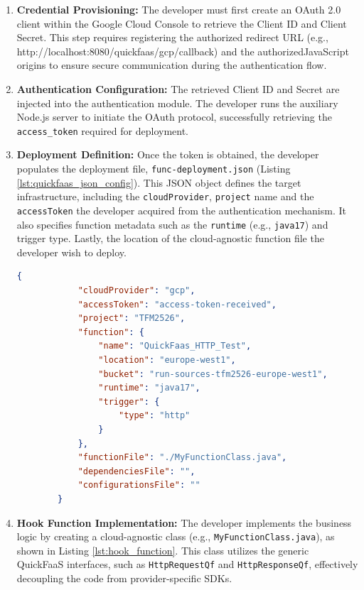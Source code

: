 \begin{enumerate}
	\item \textbf{Credential Provisioning:} The developer must first create an OAuth 2.0 client within the Google Cloud Console to retrieve the Client ID and Client Secret. This step requires registering the authorized redirect URL (e.g., \newline http://localhost:8080/quickfaas/gcp/callback) and the authorizedJavaScript origins to ensure secure communication during the authentication flow.
	
	\item \textbf{Authentication Configuration:} The retrieved Client ID and Secret are injected into the authentication module. The developer runs the auxiliary Node.js server to initiate the OAuth protocol, successfully retrieving the \texttt{access\_token} required for deployment.
	
	\item \textbf{Deployment Definition:} Once the token is obtained, the developer populates the deployment file, \texttt{func-deployment.json} (Listing \ref{lst:quickfaas_json_config}). This JSON object defines the target infrastructure, including the  \texttt{cloudProvider}, \texttt{project} name and the \texttt{accessToken} the developer acquired from the authentication mechanism. It also specifies function metadata such as the \texttt{runtime} (e.g., \texttt{java17}) and trigger type.
	Lastly, the location of the cloud-agnostic function file the developer wish to deploy. 
 
	
	\begin{lstlisting}[language=json, caption={Configuration JSON for QuickFaaS function deployment}, label={lst:quickfaas_json_config}]
		{
			"cloudProvider": "gcp",
			"accessToken": "access-token-received",
			"project": "TFM2526",
			"function": {
				"name": "QuickFaas_HTTP_Test",
				"location": "europe-west1",
				"bucket": "run-sources-tfm2526-europe-west1",
				"runtime": "java17",
				"trigger": {
					"type": "http"
				}
			},
			"functionFile": "./MyFunctionClass.java",
			"dependenciesFile": "",
			"configurationsFile": ""
		}
	\end{lstlisting}
	
	\item \textbf{Hook Function Implementation:} The developer implements the business logic by creating a cloud-agnostic class (e.g., \texttt{MyFunctionClass.java}), as shown in Listing \ref{lst:hook_function}. This class utilizes the generic QuickFaaS interfaces, such as \texttt{HttpRequestQf} and \texttt{HttpResponseQf}, effectively decoupling the code from provider-specific SDKs.
	

\end{enumerate}
